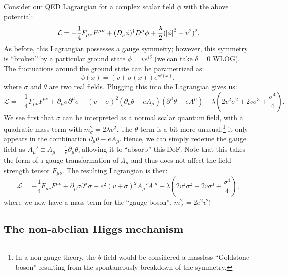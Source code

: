 Consider our QED Lagrangian for a complex scalar field $\phi$ with the above potential:
\begin{equation}
	\label{eq:01_qft_higgs_lagrangian}
	\mathcal L = -\frac{1}{4}F_{\mu\nu}F^{\mu\nu} + (D_\mu\phi)^\dagger D^\mu\phi + \frac{\lambda}{2}(\left\lvert \phi \right\rvert^2 - v^2)^2.
\end{equation}
As before, this Lagrangian possesses a \UU[1] gauge symmetry; however, this symmetry is ``broken'' by a particular ground state $\phi = v e^{i\delta}$ (we can take $\delta = 0$ WLOG).
The fluctuations around the ground state can be parametrized as:
\begin{equation}
	\label{eq:01_qft_higgs_fluctuations}
	\phi(x) = (v + \sigma(x))e^{i\theta(x)},
\end{equation}
where $\sigma$ and $\theta$ are two real fields.
Plugging this into the Lagrangian gives us:
\begin{equation}
	\label{eq:01_qft_higgs_fluctuations_lagrangian}
	\mathcal L = -\frac{1}{4}F_{\mu\nu}F^{\mu\nu} + \partial_\mu\sigma \partial^\mu\sigma + (v + \sigma)^2(\partial_\mu\theta - e A_\mu)(\partial^\mu\theta - e A^\mu) - \lambda(2v^2\sigma^2 + 2 v\sigma^3 + \frac{\sigma^4}{4}).
\end{equation}
We see first that $\sigma$ can be interpreted as a normal scalar quantum field, with a quadratic mass term with $m_\sigma^2 = 2\lambda v^2$.
The $\theta$ term is a bit more unusual;\footnote{In a non-gauge-theory, the $\theta$ field would be considered a massless ``Goldstone boson'' resulting from the spontaneously breakdown of the symmetry.}
it only appears in the combination $\partial_\mu\theta - e A_\mu$.
Hence, we can simply redefine the gauge field as $A_\mu' \equiv A_\mu + \frac{1}{e}\partial_\mu\theta$, allowing it to ``absorb'' this DoF.
Note that this takes the form of a gauge transformation of $A_\mu$ and thus does not affect the field strength tensor $F_{\mu\nu}$.
The resulting Lagrangian is then:
\begin{equation}
	\label{eq:01_qft_higgs_fluctuations_lagrangian_final}
	\mathcal L = -\frac{1}{4}F_{\mu\nu}F^{\mu\nu} + \partial_\mu\sigma \partial^\mu\sigma + e^2(v + \sigma)^2A_\mu'A^{'\mu} - \lambda(2v^2\sigma^2 + 2 v\sigma^3 + \frac{\sigma^4}{4}),
\end{equation}
where we now have a mass term for the ``gauge boson'', $m_A^2 = 2e^2 v^2$!

\subsection{The non-abelian Higgs mechanism}
\label{sec:01_qft_higgs_nonabelian}

